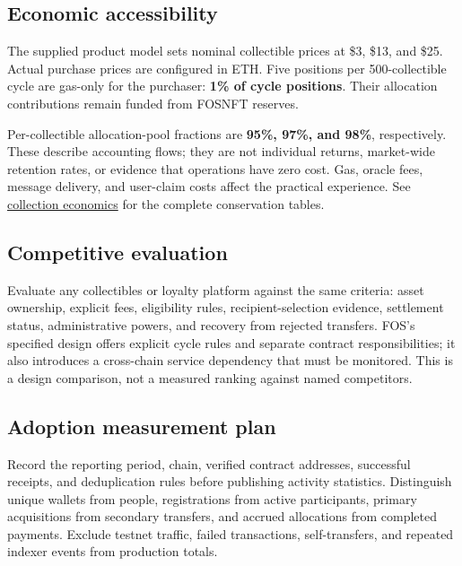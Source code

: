 \documentclass[
  10pt,
  letterpaper,
]{article}
\begin{document}
\subsection{Economic accessibility}\label{economic-accessibility}

The supplied product model sets nominal collectible prices at \$3, \$13,
and \$25. Actual purchase prices are configured in ETH. Five positions
per 500-collectible cycle are gas-only for the purchaser: \textbf{1\% of
cycle positions}. Their allocation contributions remain funded from
FOSNFT reserves.

Per-collectible allocation-pool fractions are \textbf{95\%, 97\%, and
98\%}, respectively. These describe accounting flows; they are not
individual returns, market-wide retention rates, or evidence that
operations have zero cost. Gas, oracle fees, message delivery, and
user-claim costs affect the practical experience. See
\href{https://fos.ooo/document/docs/market-insights/economics}{collection
economics} for the complete conservation tables.

\subsection{Competitive evaluation}\label{competitive-evaluation}

Evaluate any collectibles or loyalty platform against the same criteria:
asset ownership, explicit fees, eligibility rules, recipient-selection
evidence, settlement status, administrative powers, and recovery from
rejected transfers. FOS's specified design offers explicit cycle rules
and separate contract responsibilities; it also introduces a cross-chain
service dependency that must be monitored. This is a design comparison,
not a measured ranking against named competitors.

\subsection{Adoption measurement plan}\label{adoption-measurement-plan}

Record the reporting period, chain, verified contract addresses,
successful receipts, and deduplication rules before publishing activity
statistics. Distinguish unique wallets from people, registrations from
active participants, primary acquisitions from secondary transfers, and
accrued allocations from completed payments. Exclude testnet traffic,
failed transactions, self-transfers, and repeated indexer events from
production totals.
\end{document}
